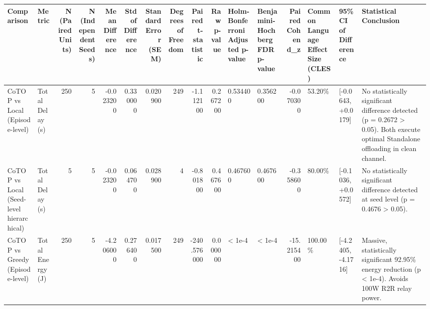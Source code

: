 \begin{tabular}{llrrrrrrrrllrlll}
\toprule
Comparison & Metric & N (Paired Units) & N (Independent Seeds) & Mean Difference & Std of Difference & Standard Error (SEM) & Degrees of Freedom & Paired t-statistic & Raw p-value & Holm-Bonferroni Adjusted p-value & Benjamini-Hochberg FDR p-value & Paired Cohen d\_z & Common Language Effect Size (CLES) & 95\% CI of Difference & Statistical Conclusion \\
\midrule
CoTOP vs Local (Episode-level) & Total Delay (s) & 250 & 5 & -0.023200 & 0.330000 & 0.020900 & 249 & -1.112100 & 0.267200 & 0.534400 & 0.356200 & -0.070300 & 53.20\% & [-0.0643, +0.0179] & No statistically significant difference detected (p = 0.2672 > 0.05). Both execute optimal Standalone offloading in clean channel. \\
CoTOP vs Local (Seed-level hierarchical) & Total Delay (s) & 5 & 5 & -0.023200 & 0.064700 & 0.028900 & 4 & -0.801800 & 0.467600 & 0.467600 & 0.467600 & -0.358600 & 80.00\% & [-0.1036, +0.0572] & No statistically significant difference detected at seed level (p = 0.4676 > 0.05). \\
CoTOP vs Greedy (Episode-level) & Total Energy (J) & 250 & 5 & -4.206000 & 0.276400 & 0.017500 & 249 & -240.576000 & 0.000000 & < 1e-4 & < 1e-4 & -15.215400 & 100.00\% & [-4.2405, -4.1716] & Massive, statistically significant 92.95\% energy reduction (p < 1e-4). Avoids 100W R2R relay power. \\
\bottomrule
\end{tabular}

